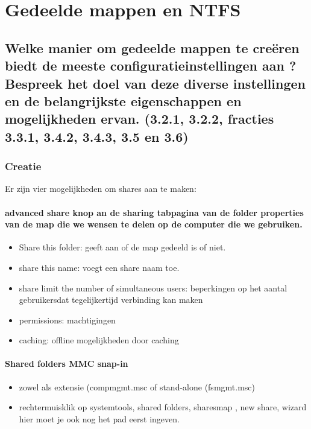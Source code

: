 \chapter{Gedeelde mappen en NTFS}
\section{Welke manier om gedeelde mappen te cre\"eren biedt de meeste configuratieinstellingen aan ? Bespreek het doel van deze diverse instellingen en de belangrijkste eigenschappen en mogelijkheden ervan. (3.2.1, 3.2.2, fracties 3.3.1, 3.4.2, 3.4.3, 3.5 en 3.6)}

\subsection{Creatie}
Er zijn vier mogelijkheden om shares aan te maken:
\subsubsection{advanced share knop an de sharing tabpagina van de folder properties van de map die we wensen te delen op de computer die we gebruiken.}
\begin{itemize}
\item Share this folder: geeft aan of de map gedeeld is of niet.
\item share this name: voegt een share naam toe.
\item share limit the number of simultaneous users: beperkingen op het aantal gebruikersdat tegelijkertijd verbinding kan maken
\item permissions: machtigingen
\item caching: offline mogelijkheden door caching
\end{itemize}

\subsubsection{Shared folders MMC snap-in}
\begin{itemize}
\item zowel als extensie (compmgmt.msc of stand-alone (fsmgmt.msc)
\item rechtermuisklik op systemtools, shared folders, sharesmap , new share, wizard hier moet je ook nog het pad eerst ingeven.
\end{itemize}

